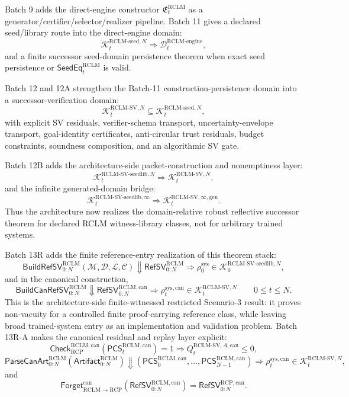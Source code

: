 \documentclass[11pt,a4paper]{article}
\newcommand{\Kcal}{\mathcal K}
\newcommand{\Dcal}{\mathcal D}
\newcommand{\RCP}{\mathrm{RCP}}
\newcommand{\RCLM}{\mathrm{RCLM}}
\newcommand{\sys}{\mathrm{sys}}
\newcommand{\engine}{\mathrm{engine}}
\begin{document}
Batch 9 adds the direct-engine constructor \(\mathfrak E_t^{\RCLM}\) as a generator/certifier/selector/realizer pipeline.  Batch 11 gives a declared seed/library route into the direct-engine domain:
\[
\Kcal_t^{\RCLM\text{-}\mathrm{seed},N}
\Longrightarrow
\Dcal_t^{\RCLM\text{-}\engine},
\]
and a finite successor seed-domain persistence theorem when exact seed persistence or \(\mathsf{SeedEq}_t^{\RCLM}\) is valid.

Batch 12 and 12A strengthen the Batch-11 construction-persistence domain into a successor-verification domain:
\[
\Kcal_t^{\RCLM\text{-}\mathrm{SV},N}
\subseteq
\Kcal_t^{\RCLM\text{-}\mathrm{seed},N},
\]
with explicit SV residuals, verifier-schema transport, uncertainty-envelope transport, goal-identity certificates, anti-circular trust residuals, budget constraints, soundness composition, and an algorithmic SV gate.

Batch 12B adds the architecture-side packet-construction and nonemptiness layer:
\[
\Kcal_t^{\RCLM\text{-}\mathrm{SV\mbox{-}seedlib},N}
\Longrightarrow
\Kcal_t^{\RCLM\text{-}\mathrm{SV},N},
\]
and the infinite generated-domain bridge:
\[
\Kcal_t^{\RCLM\text{-}\mathrm{SV\mbox{-}seedlib},\infty}
\Longrightarrow
\Kcal_t^{\RCLM\text{-}\mathrm{SV},\infty,\mathrm{gen}}.
\]
Thus the architecture now realizes the domain-relative robust reflective successor theorem for declared RCLM witness-library classes, not for arbitrary trained systems.

Batch 13R adds the finite reference-entry realization of this theorem stack:
\[
\mathsf{BuildRefSV}_{0:N}^{\RCLM}(\mathcal M,\mathcal D,\mathcal L,\mathcal C)
\Downarrow
\mathsf{RefSV}_{0:N}^{\RCLM}
\Longrightarrow
\rho_0^{\sys}\in\Kcal_0^{\RCLM\text{-}\mathrm{SV\mbox{-}seedlib},N},
\]
and in the canonical construction,
\[
\mathsf{BuildCanRefSV}_{0:N}^{\RCLM}
\Downarrow
\mathsf{RefSV}_{0:N}^{\RCLM,\mathrm{can}}
\Longrightarrow
\rho_t^{\sys,\mathrm{can}}\in\Kcal_t^{\RCLM\text{-}\mathrm{SV},N}
\qquad 0\le t\le N.
\]
This is the architecture-side finite-witnessed restricted Scenario-3 result: it proves non-vacuity for a controlled finite proof-carrying reference class, while leaving broad trained-system entry as an implementation and validation problem.
Batch 13R-A makes the canonical residual and replay layer explicit:
\[
\mathsf{Check}_{\RCP}^{\RCLM,\mathrm{can}}(\mathsf{PCS}_t^{\RCLM,\mathrm{can}})=1
\Longrightarrow
Q_t^{\RCLM\text{-}\mathrm{SV},A,\mathrm{can}}\le0,
\]
\[
\mathsf{ParseCanArt}_{0:N}^{\RCLM}(\mathsf{Artifact}_{0:N}^{\RCLM})
\Downarrow
(\mathsf{PCS}_0^{\RCLM,\mathrm{can}},\ldots,\mathsf{PCS}_{N-1}^{\RCLM,\mathrm{can}})
\Longrightarrow
\rho_t^{\sys,\mathrm{can}}\in\Kcal_t^{\RCLM\text{-}\mathrm{SV},N},
\]
and
\[
\mathsf{Forget}_{\RCLM\to\RCP}^{\mathrm{can}}(\mathsf{RefSV}_{0:N}^{\RCLM,\mathrm{can}})=\mathsf{RefSV}_{0:N}^{\RCP,\mathrm{can}}.
\]
\end{document}
